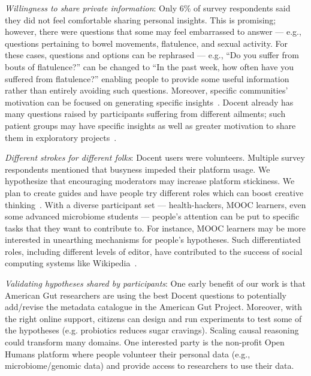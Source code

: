 \textit{Willingness to share private information}: Only 6\% of survey respondents said they did not feel comfortable sharing personal insights. This is promising; however, there were questions that some may feel embarrassed to answer — e.g., questions pertaining to bowel movements, flatulence, and sexual activity. For these cases, questions and options can be rephrased — e.g., “Do you suffer from bouts of flatulence?” can be changed to “In the past week, how often have you suffered from flatulence?” enabling people to provide some useful information rather than entirely avoiding such questions. Moreover, specific communities’ motivation can be focused on generating specific insights~\cite{Chandler2013}. Docent already has many questions raised by participants suffering from different ailments; such patient groups may have specific insights as well as greater motivation to share them in exploratory projects~\cite{Karkar2017a}.

\textit{Different strokes for different folks}: Docent users were volunteers. Multiple survey respondents mentioned that busyness impeded their platform usage. We hypothesize that encouraging moderators may increase platform stickiness. We plan to create guides and have people try different roles which can boost creative thinking~\cite{Teevan:2017:BWC:3059454.3059467}. With a diverse participant set — health-hackers, MOOC learners, even some advanced microbiome students — people’s attention can be put to specific tasks that they want to contribute to. For instance, MOOC learners may be more interested in unearthing mechanisms for people’s hypotheses. Such differentiated roles, including different levels of editor, have contributed to the success of social computing systems like Wikipedia~\cite{Krieger2009}.

\textit{Validating hypotheses shared by participants}: One early benefit of our work is that American Gut researchers are using the best Docent questions to potentially add/revise the metadata catalogue in the American Gut Project. Moreover, with the right online support, citizens can design and run experiments to test some of the hypotheses (e.g. probiotics reduces sugar cravings). Scaling causal reasoning could transform many domains. One interested party is the non-profit Open Humans platform where people volunteer their personal data (e.g., microbiome/genomic data) and provide access to researchers to use their data.

